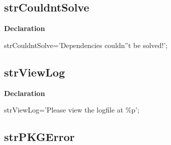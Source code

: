 \documentclass{report}
\newif\ifpdf
\begin{document}
\subsection*{strCouldntSolve}
\fi
\label{trstrings-strCouldntSolve}
\begin{list}{}{
\setlength{\itemindent}{0cm}
\setlength{\listparindent}{0cm}
\setlength{\leftmargin}{\evensidemargin}
\addtolength{\leftmargin}{\tmplength}
\settowidth{\labelsep}{X}
\addtolength{\leftmargin}{\labelsep}
\setlength{\labelwidth}{\tmplength}
}
\item[\textbf{Declaration}\hfill]
\ifpdf
\begin{flushleft}
\fi
\begin{ttfamily}
strCouldntSolve='Dependencies couldn''t be solved!';\end{ttfamily}

\ifpdf
\end{flushleft}
\fi

\end{list}
\ifpdf
\subsection*{\large{\textbf{strViewLog}}\normalsize\hspace{1ex}\hrulefill}
\else
\subsection*{strViewLog}
\fi
\label{trstrings-strViewLog}
\begin{list}{}{
\setlength{\itemindent}{0cm}
\setlength{\listparindent}{0cm}
\setlength{\leftmargin}{\evensidemargin}
\addtolength{\leftmargin}{\tmplength}
\settowidth{\labelsep}{X}
\addtolength{\leftmargin}{\labelsep}
\setlength{\labelwidth}{\tmplength}
}
\item[\textbf{Declaration}\hfill]
\ifpdf
\begin{flushleft}
\fi
\begin{ttfamily}
strViewLog='Please view the logfile at {\%}p';\end{ttfamily}

\ifpdf
\end{flushleft}
\fi

\end{list}
\ifpdf
\subsection*{\large{\textbf{strPKGError}}\normalsize\hspace{1ex}\hrulefill}
\else
\end{document}
